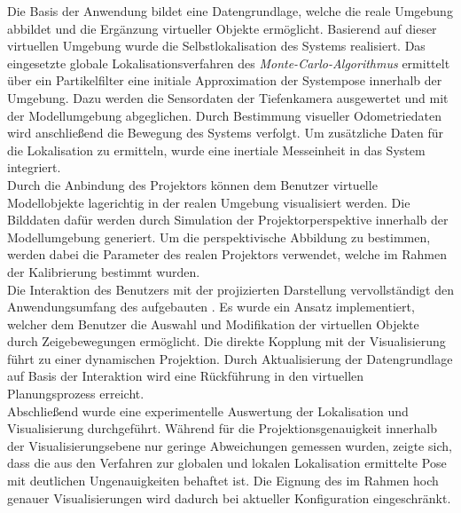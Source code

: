 Die Basis der Anwendung bildet eine Datengrundlage, welche die reale Umgebung abbildet und die Ergänzung virtueller Objekte ermöglicht. Basierend auf dieser virtuellen Umgebung wurde die Selbstlokalisation des Systems realisiert. Das eingesetzte globale Lokalisationsverfahren des \textit{Monte-Carlo-Algorithmus} ermittelt über ein Partikelfilter eine initiale Approximation der Systempose innerhalb der Umgebung. Dazu werden die Sensordaten der Tiefenkamera ausgewertet und mit der Modellumgebung abgeglichen. Durch Bestimmung visueller Odometriedaten wird anschließend die Bewegung des Systems verfolgt. Um zusätzliche Daten für die Lokalisation zu ermitteln, wurde eine inertiale Messeinheit in das System integriert.\\

Durch die Anbindung des Projektors können dem Benutzer virtuelle Modellobjekte lagerichtig in der realen Umgebung visualisiert werden. Die Bilddaten dafür werden durch Simulation der Projektorperspektive innerhalb der Modellumgebung generiert. Um die perspektivische Abbildung zu bestimmen, werden dabei die Parameter des realen Projektors verwendet, welche im Rahmen der Kalibrierung bestimmt wurden.\\

Die Interaktion des Benutzers mit der projizierten Darstellung vervollständigt den Anwendungsumfang des aufgebauten . Es wurde ein Ansatz implementiert, welcher dem Benutzer die Auswahl und Modifikation der virtuellen Objekte durch Zeigebewegungen ermöglicht. Die direkte Kopplung mit der Visualisierung führt zu einer dynamischen Projektion. Durch Aktualisierung der Datengrundlage auf Basis der Interaktion wird eine Rückführung in den virtuellen Planungsprozess erreicht.\\

Abschließend wurde eine experimentelle Auswertung der Lokalisation und Visualisierung durchgeführt. Während für die Projektionsgenauigkeit innerhalb der Visualisierungsebene nur geringe Abweichungen gemessen wurden, zeigte sich, dass die aus den Verfahren zur globalen und lokalen Lokalisation ermittelte Pose mit deutlichen Ungenauigkeiten behaftet ist. Die Eignung des  im Rahmen hoch genauer Visualisierungen wird dadurch bei aktueller Konfiguration eingeschränkt.\\

